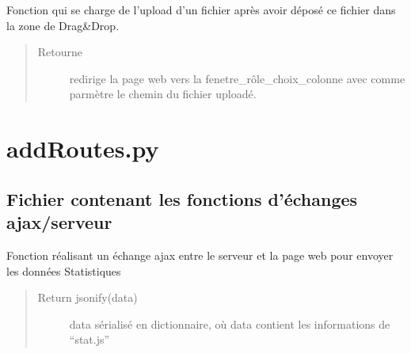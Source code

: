 \documentclass[letterpaper,10pt,openany,oneside,french]{sphinxmanual}
\begin{document}

\begin{fulllineitems}
\label{\detokenize{choixFichier:interface_web.choixFichier.FileWithDragDrop}}
Fonction qui se charge de l’upload d’un fichier après avoir déposé ce fichier dans la zone de Drag\&Drop.
\begin{quote}\begin{description}
\item[{Retourne}] \leavevmode
redirige la page web vers la fenetre\_rôle\_choix\_colonne avec comme parmètre le chemin du fichier uploadé.

\end{description}\end{quote}

\end{fulllineitems}



\chapter{addRoutes.py}
\label{\detokenize{addRoutes:addroutes-py}}\label{\detokenize{addRoutes::doc}}\label{\detokenize{addRoutes:module-interface_web.addRoutes}}

\section{Fichier  contenant les fonctions d’échanges ajax/serveur}
\label{\detokenize{addRoutes:fichier-addroutes-py-contenant-les-fonctions-d-echanges-ajax-serveur}}

\begin{fulllineitems}
\label{\detokenize{addRoutes:interface_web.addRoutes.iStats}}
Fonction réalisant un échange ajax entre le serveur et la page web pour envoyer les données Statistiques
\begin{quote}\begin{description}
\item[{Return jsonify(data)}] \leavevmode
data sérialisé en dictionnaire, où data contient les informations de “stat.js”

\end{description}\end{quote}

\end{fulllineitems}
\end{document}
